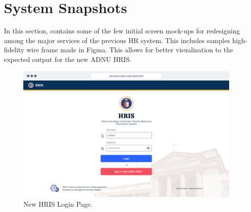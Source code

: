         
        
        
    
\section{System Snapshots}

In this section, contains some of the few initial screen mock-ups for redesigning among the major services of the previous HR system. This includes samples high-fidelity wire frame made in Figma. This allows for better visualization to the expected output for the new ADNU HRIS.

    \begin{figure}[H]
        \centering
        \includegraphics[width=1\linewidth]{figures/app/login.png}
        \caption{New HRIS Login Page.}
        \label{fig:app-login}
    \end{figure}

